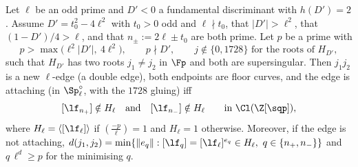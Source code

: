 \begin{theorem}\label{thm:Agen}
Let $\ell$ be an odd prime and $D'<0$ a fundamental discriminant with $h(D')=2$.  Assume $D'=t_0^2-4\ell^2$ with
$t_0>0$ odd and $\ell\nmid t_0$, that $|D'|>\ell^2$, that $(1-D')/4>\ell$, and that $n_\pm:=2\ell\pm t_0$ are both prime.  Let
$p$ be a prime with
\[p>\max\bigl(\ell^2|D'|,\ 4\ell^2\bigr),\qquad p\nmid D',\qquad j\notin\{0,1728\}\text{ for the roots of }H_{D'},\]
such that $H_{D'}$ has two roots $j_1\neq j_2$ in $\Fp$ and both are supersingular.  Then $j_1j_2$ is a new $\ell$-edge (a double
edge), both endpoints are floor curves, and the edge is attaching (in $\Sp^\circ_\ell$, with the $1728$ gluing) iff
\[[\lf_{n_+}]\notin H_\ell\quad\text{and}\quad[\lf_{n_-}]\notin H_\ell\qquad\text{in }\Cl(\Z[\sqp]),\]
where $H_\ell=\langle[\lf_\ell]\rangle$ if $(\frac{-p}\ell)=1$ and $H_\ell=1$ otherwise.  Moreover, if the edge is not attaching,
$d(j_1,j_2)=\min\{\|e_q\|:[\lf_q]=[\lf_\ell]^{e_q}\in H_\ell,\ q\in\{n_+,n_-\}\}$ and $q\,\ell^{d}\ge p$ for the minimising $q$.
\end{theorem}
